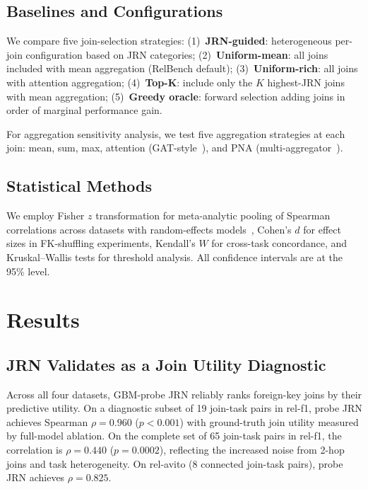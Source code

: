 \documentclass[11pt,letterpaper]{article}
\begin{document}
\subsection{Baselines and Configurations}

We compare five join-selection strategies: (1)~\textbf{JRN-guided}: heterogeneous per-join configuration based on JRN categories; (2)~\textbf{Uniform-mean}: all joins included with mean aggregation (RelBench default); (3)~\textbf{Uniform-rich}: all joins with attention aggregation; (4)~\textbf{Top-K}: include only the $K$ highest-JRN joins with mean aggregation; (5)~\textbf{Greedy oracle}: forward selection adding joins in order of marginal performance gain.

For aggregation sensitivity analysis, we test five aggregation strategies at each join: mean, sum, max, attention (GAT-style~\citep{Velickovic2018}), and PNA (multi-aggregator~\citep{Corso2020}).

\subsection{Statistical Methods}

We employ Fisher $z$ transformation for meta-analytic pooling of Spearman correlations across datasets with random-effects models~\citep{Borenstein2017}, Cohen's $d$ for effect sizes in FK-shuffling experiments, Kendall's $W$ for cross-task concordance, and Kruskal--Wallis tests for threshold analysis. All confidence intervals are at the 95\% level.

\section{Results}
\label{sec:results}

\subsection{JRN Validates as a Join Utility Diagnostic}
\label{sec:validation}

Across all four datasets, GBM-probe JRN reliably ranks foreign-key joins by their predictive utility. On a diagnostic subset of 19 join-task pairs in rel-f1, probe JRN achieves Spearman $\rho = 0.960$ ($p < 0.001$) with ground-truth join utility measured by full-model ablation. On the complete set of 65 join-task pairs in rel-f1, the correlation is $\rho = 0.440$ ($p = 0.0002$), reflecting the increased noise from 2-hop joins and task heterogeneity. On rel-avito (8 connected join-task pairs), probe JRN achieves $\rho = 0.825$.
\end{document}

